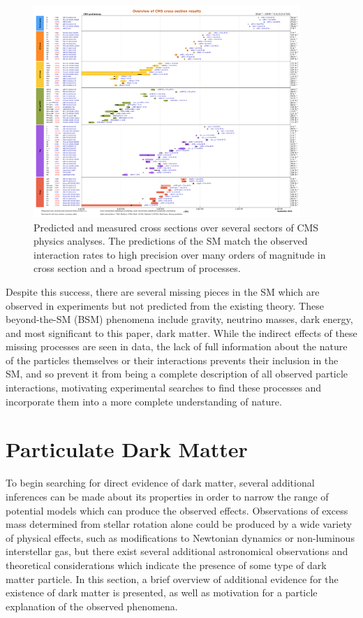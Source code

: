 \begin{figure}[htpb]
	\includegraphics[width=0.9\textwidth]{figures/smRatePreds.pdf}
	\centering
	\caption[CMS Cross Section Results]{Predicted and measured cross sections over several sectors of CMS physics analyses. The predictions of the SM match the observed interaction rates to high precision over many orders of magnitude in cross section and a broad spectrum of processes.}
	\label{fig:SMratePreds}
\end{figure}

Despite this success, there are several missing pieces in the SM which are observed in experiments but not predicted from the existing theory.
These beyond-the-SM (BSM) phenomena include gravity, neutrino masses, dark energy, and most significant to this paper, dark matter.
While the indirect effects of these missing processes are seen in data, the lack of full information about the nature of the particles themselves or their interactions prevents their inclusion in the SM, and so prevent it from being a complete description of all observed particle interactions, motivating experimental searches to find these processes and incorporate them into a more complete understanding of nature.

\section{Particulate Dark Matter}
To begin searching for direct evidence of dark matter, several additional inferences can be made about its properties in order to narrow the range of potential models which can produce the observed effects.
Observations of excess mass determined from stellar rotation alone could be produced by a wide variety of physical effects, such as modifications to Newtonian dynamics or non-luminous interstellar gas, but there exist several additional astronomical observations and theoretical considerations which indicate the presence of some type of dark matter particle.
In this section, a brief overview of additional evidence for the existence of dark matter is presented, as well as motivation for a particle explanation of the observed phenomena.

